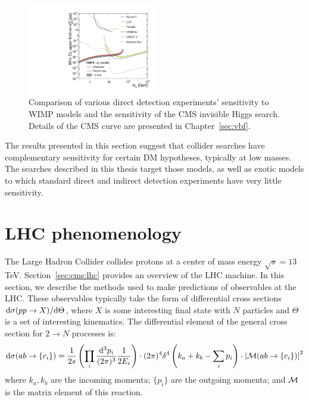 \begin{figure}[]
    \begin{center}
        \includegraphics[width=0.5\textwidth]{figures/vbf/fits/dd.pdf}
        \caption{Comparison of various direct detection experiments' sensitivity to WIMP models and the sensitivity of the CMS invisible Higgs search.
                 Details of the CMS curve are presented in Chapter~\ref{sec:vbf}.}
        \label{fig:theory:lux}
    \end{center}
\end{figure}

The results presented in this section suggest that collider searches have complementary sensitivity for certain DM hypotheses, typically at low masses.
The searches described in this thesis target those models, as well as exotic models to which standard direct and indirect detection experiments have very little sensitivity.

\section{LHC phenomenology}

The Large Hadron Collider collides protons at a center of mass energy $\sqrt{s} = 13$ TeV.
Section~\ref{sec:cms:lhc} provides an overview of the LHC machine.
In this section, we describe the methods used to make predictions of observables at the LHC.
These observables typically take the form of differential cross sections $\mathrm{d}\sigma(pp\rightarrow X)/\mathrm{d}\Theta$, where $X$ is some interesting final state with $N$ particles and $\Theta$ is a set of interesting kinematics.
The differential element of the general cross section for $2\rightarrow N$ processes is:
\begin{equation}
\mathrm{d}\sigma(ab\rightarrow \{c_i\}) = 
    \frac{1}{2s} \left(\prod_i \dfrac{\mathrm{d}^3p_i}{(2\pi)^3} \frac{1}{2E_i}\right) 
        \cdot (2\pi)^4 \delta^4\left(k_a + k_b - \sum_i p_i\right) 
        \cdot \left|\mathcal{M}(ab\rightarrow \{c_i\})\right|^2
        \label{eq:theory:2n}
\end{equation}
where $k_a,k_b$ are the incoming momenta; $\{p_i\}$ are the outgoing momenta; and $\mathcal{M}$ is the matrix element of this reaction.

